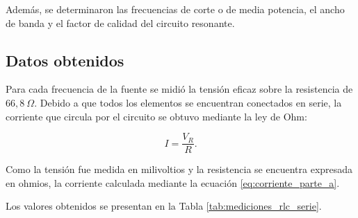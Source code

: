 Además, se determinaron las frecuencias de corte o de media potencia, el ancho
de banda y el factor de calidad del circuito resonante.

\subsection{Datos obtenidos}

Para cada frecuencia de la fuente se midió la tensión eficaz sobre la
resistencia de $66{,}8\ \Omega$. Debido a que todos los elementos se encuentran
conectados en serie, la corriente que circula por el circuito se obtuvo
mediante la ley de Ohm:

\begin{equation}
    I=\frac{V_R}{R}.
    \label{eq:corriente_parte_a}
\end{equation}

Como la tensión fue medida en milivoltios y la resistencia se encuentra
expresada en ohmios, la corriente calculada mediante la ecuación
\ref{eq:corriente_parte_a}.

Los valores obtenidos se presentan en la Tabla
\ref{tab:mediciones_rlc_serie}.


